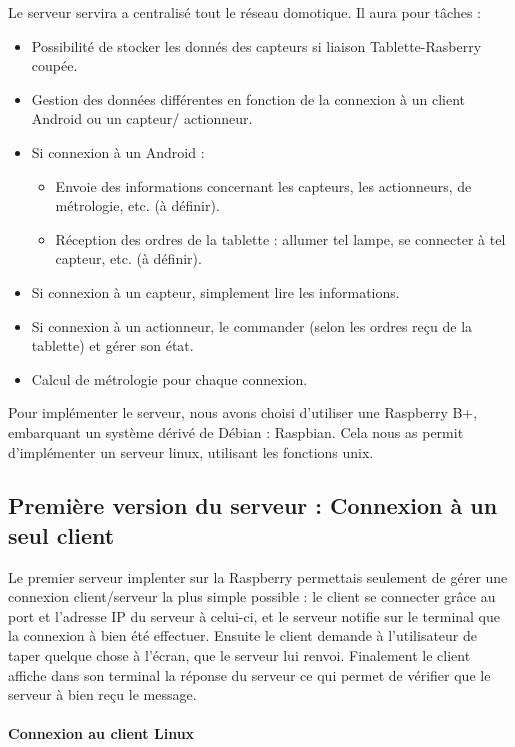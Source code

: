 \documentclass[a4paper,10pt]{article}
\begin{document}
Le serveur servira a centralisé tout le réseau domotique. Il aura pour tâches : \\
\begin{itemize}
	\item Possibilité de stocker les donnés des capteurs si liaison Tablette-Rasberry coupée.
	\item Gestion des données différentes en fonction de la connexion à un client Android ou un capteur/	actionneur. 
	\item Si connexion à un Android : 
		\begin{itemize}
			\item Envoie des informations concernant les capteurs, les actionneurs, de métrologie, etc. (à définir).
			\item Réception des ordres de la tablette : allumer tel lampe, se connecter à tel capteur, etc. (à définir).
		\end{itemize}
	\item Si connexion à un capteur, simplement lire les informations.
	\item Si connexion à un actionneur, le commander (selon les ordres reçu de la tablette) et gérer son état.
	\item Calcul de métrologie pour chaque connexion.
\end{itemize}

Pour implémenter le serveur, nous avons choisi d'utiliser une Raspberry B+, embarquant un système dérivé de Débian : Raspbian. Cela nous as permit d'implémenter un serveur linux, utilisant les fonctions unix.

\subsection{Première version du serveur : Connexion à un seul client}

Le premier serveur implenter sur la Raspberry permettais seulement de gérer une connexion client/serveur la plus simple possible : le client se connecter grâce au port et l'adresse IP du serveur à celui-ci, et le serveur notifie sur le terminal que la connexion à bien été effectuer. Ensuite le client demande à l'utilisateur de taper quelque chose à l'écran, que le serveur lui renvoi. Finalement le client affiche dans son terminal la réponse du serveur ce qui permet de vérifier que le serveur à bien reçu le message.

\paragraph{Connexion au client Linux}
\end{document}
